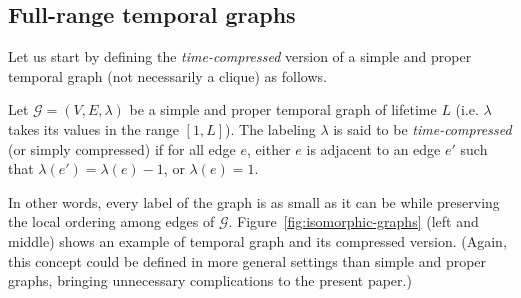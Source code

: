 \documentclass[USenglish, a4paper, thm-restate,numberwithinsect, cleveref]{lipics-v2021}
\newcommand{\G}{\ensuremath{\mathcal{G}}\xspace}
\begin{document}
\subsection{Full-range temporal graphs}

Let us start by defining the \emph{time-compressed} version of a simple and proper temporal graph (not necessarily a clique) as follows.

\begin{definition}
  Let $\G=(V,E,\lambda)$ be a simple and proper temporal graph of lifetime $L$ (i.e. $\lambda$ takes its values in the range $[1,L]$). The labeling $\lambda$ is said to be \emph{time-compressed} (or simply compressed) if for all edge $e$, either $e$ is adjacent to an edge $e'$ such that $\lambda(e')=\lambda(e)-1$, or $\lambda(e)=1$.
\end{definition}

In other words, every label of the graph is as small as it can be while preserving the local ordering among edges of $\G$. Figure~\ref{fig:isomorphic-graphs} (left and middle) shows an example of temporal graph and its compressed version. (Again, this concept could be defined in more general settings than simple and proper graphs, bringing unnecessary complications to the present paper.)
\end{document}
